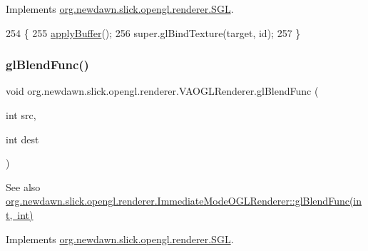 Implements \mbox{\hyperlink{interfaceorg_1_1newdawn_1_1slick_1_1opengl_1_1renderer_1_1_s_g_l_a7b546bba69c511f7d96d055ac1ed6a21}{org.\+newdawn.\+slick.\+opengl.\+renderer.\+S\+GL}}.


\begin{DoxyCode}
254                                                   \{
255         \mbox{\hyperlink{classorg_1_1newdawn_1_1slick_1_1opengl_1_1renderer_1_1_v_a_o_g_l_renderer_a7c5d09419cd40761be8f849631aebab5}{applyBuffer}}();
256         super.glBindTexture(target, \textcolor{keywordtype}{id});
257     \}
\end{DoxyCode}
\mbox{\label{classorg_1_1newdawn_1_1slick_1_1opengl_1_1renderer_1_1_v_a_o_g_l_renderer_a97ff78c9e3edba2affe402b59e18d848}} 
\subsubsection{\texorpdfstring{gl\+Blend\+Func()}{glBlendFunc()}}
{\footnotesize\ttfamily void org.\+newdawn.\+slick.\+opengl.\+renderer.\+V\+A\+O\+G\+L\+Renderer.\+gl\+Blend\+Func (\begin{DoxyParamCaption}\item[{int}]{src,  }\item[{int}]{dest }\end{DoxyParamCaption})\hspace{0.3cm}{\ttfamily [inline]}}

\begin{DoxySeeAlso}{See also}
\mbox{\hyperlink{classorg_1_1newdawn_1_1slick_1_1opengl_1_1renderer_1_1_immediate_mode_o_g_l_renderer_af241eb86655622bc19f902ff4dd2033d}{org.\+newdawn.\+slick.\+opengl.\+renderer.\+Immediate\+Mode\+O\+G\+L\+Renderer\+::gl\+Blend\+Func(int, int)}} 
\end{DoxySeeAlso}


Implements \mbox{\hyperlink{interfaceorg_1_1newdawn_1_1slick_1_1opengl_1_1renderer_1_1_s_g_l_afa605b9f35a519c10dbed88c79be96af}{org.\+newdawn.\+slick.\+opengl.\+renderer.\+S\+GL}}.



